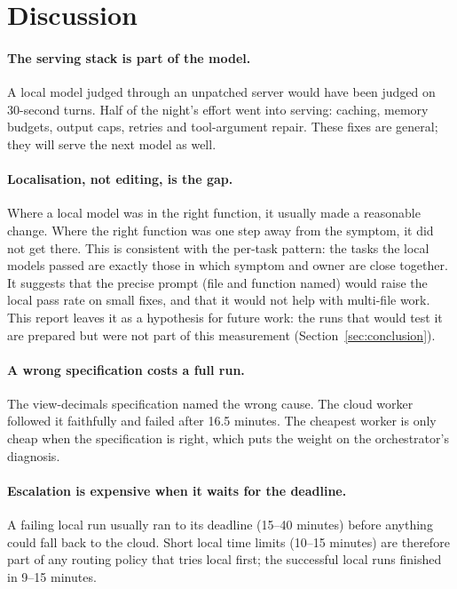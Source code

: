 \section{Discussion}\label{sec:discussion}

\paragraph{The serving stack is part of the model.} A local model judged through an unpatched server would have been
judged on 30-second turns. Half of the night's effort went into serving: caching, memory budgets, output caps, retries
and tool-argument repair. These fixes are general; they will serve the next model as well.

\paragraph{Localisation, not editing, is the gap.} Where a local model was in the right function, it usually made a
reasonable change. Where the right function was one step away from the symptom, it did not get there. This is
consistent with the per-task pattern: the tasks the local models passed are exactly those in which symptom and owner
are close together. It suggests that the precise prompt (file and function named) would raise the local pass rate on
small fixes, and that it would not help with multi-file work. This report leaves it as a hypothesis for future work: the runs that would test it are prepared but were not part of
this measurement (Section~\ref{sec:conclusion}).

\paragraph{A wrong specification costs a full run.} The view-decimals specification named the wrong cause. The cloud
worker followed it faithfully and failed after 16.5 minutes. The cheapest worker is only cheap when the specification
is right, which puts the weight on the orchestrator's diagnosis.

\paragraph{Escalation is expensive when it waits for the deadline.} A failing local run usually ran to its deadline
(15--40 minutes) before anything could fall back to the cloud. Short local time limits (10--15 minutes) are therefore
part of any routing policy that tries local first; the successful local runs finished in 9--15 minutes.

